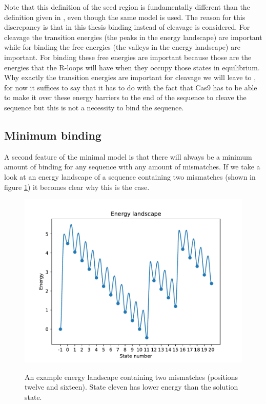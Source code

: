 Note that this definition of the seed region is fundamentally different than the definition given in \cite{Misha}, even though the same model is used. The reason for this discrepancy is that in this thesis binding instead of cleavage is considered. For cleavage the transition energies (the peaks in the energy landscape) are important while for binding the free energies (the valleys in the energy landscape) are important. For binding these free energies are important because those are the energies that the R-loops will have when they occupy those states in equilibrium. Why exactly the transition energies are important for cleavage we will leave to \citep{Misha}, for now it suffices to say that it has to do with the fact that Cas9 has to be able to make it over these energy barriers to the end of the sequence to cleave the sequence but this is not a necessity to bind the sequence.


\subsection{Minimum binding}

A second feature of the minimal model is that there will always be a minimum amount of binding for any sequence with any amount of mismatches. If we take a look at an energy landscape of a sequence containing two mismatches (shown in figure \ref{fig:minbindingexample}) it becomes clear why this is the case.

\begin{figure}[H]
\begin{center}
\includegraphics[width=\textwidth]{images/minbindingexample}
\label{fig:minbindingexample}
\caption{An example energy landscape containing two mismatches (positions twelve and sixteen). State eleven has lower energy than the solution state. }
\end{center}
\end{figure}

